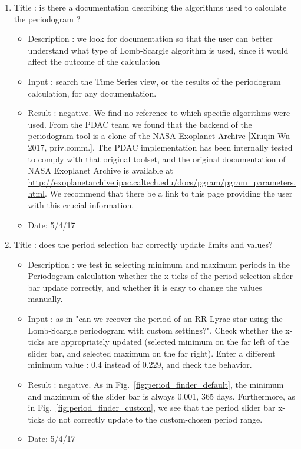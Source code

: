 \documentclass[DM,lsstdraft,toc,usenatbib]{lsstdoc}
\begin{document}
\begin{enumerate}
   \item Title : is there a documentation describing the algorithms used to calculate the periodogram ?  
    \begin{itemize}
      \item Description : we look for documentation so that the user can better understand what type of Lomb-Scargle algorithm is used, since it would affect the outcome of the calculation
      \item Input : search the Time Series view, or the results of the periodogram calculation, for any documentation. 
      \item Result : negative. We find no reference to which specific algorithms were used. From the PDAC team we found that the backend of the periodogram tool is a clone of the NASA Exoplanet Archive [Xiuqin Wu 2017, priv.comm.]. The PDAC implementation has been internally tested to comply with that original toolset,  and the original documentation of NASA Exoplanet Archive is available at \url{http://exoplanetarchive.ipac.caltech.edu/docs/pgram/pgram_parameters.html}. We recommend that there be a link to this page providing the user with this crucial information. 
      \item Date: 5/4/17 
    \end{itemize}

   \item Title : does the period selection bar correctly  update limits and values? 
    \begin{itemize}
      \item Description : we test in selecting minimum and maximum periods in the Periodogram calculation whether the x-ticks of the period selection slider bar update correctly, and whether it is easy to change the values manually. 
      \item Input : as in "can we recover the period of an RR Lyrae  star using the Lomb-Scargle periodogram with custom settings?". Check whether the x-ticks are appropriately updated (selected minimum on the far left of the slider bar,  and selected maximum on the far right). Enter a different minimum value : 0.4 instead of 0.229, and check the behavior. 
      \item Result : negative.  As in Fig.~\ref{fig:period_finder_default}, the minimum and maximum of the slider bar is always 0.001, 365 days. Furthermore, as in Fig.~\ref{fig:period_finder_custom}, we see that the period slider bar x-ticks do not correctly update to the custom-chosen period range. 
      \item Date: 5/4/17
    \end{itemize}



\end{enumerate}
\end{document}

